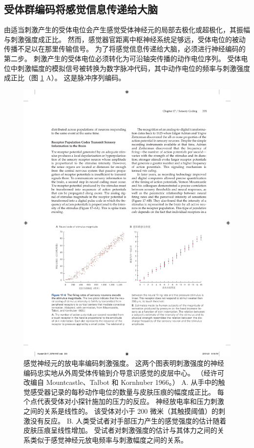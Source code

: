 \subsection{受体群编码将感觉信息传递给大脑}

由适当刺激产生的受体电位会产生感觉受体神经元的局部去极化或超极化，其振幅与刺激强度成正比。 
然而，感觉器官距离中枢神经系统足够远，受体电位的被动传播不足以在那里传输信号。 
为了将感觉信息传递给大脑，必须进行神经编码的第二步。 
刺激产生的受体电位必须转化为可沿轴突传播的动作电位序列。 
受体电位中刺激幅度的模拟信号被转换为数字脉冲代码，其中动作电位的频率与刺激强度成正比（图 \ref{fig:17_6} A）。 
这是脉冲序列编码。

\begin{figure}[htbp]
	\centering
	\includegraphics[width=1.0\linewidth]{chap17/fig_17_6}
	\caption{感觉神经元的放电率编码刺激强度。 
		这两个图表明刺激强度的神经编码忠实地从外周受体传输到介导意识感觉的皮层中心。 （经许可改编自 Mountcastle、Talbot 和 Kornhuber 1966。） 
		A. 从手中的触觉感受器记录的每秒动作电位的数量与皮肤压痕的幅度成正比。 
		每个点代表受体对小探针施加的压力的反应。 
		神经放电率和压力刺激之间的关系是线性的。 
		该受体对小于 200 微米（其触摸阈值）的刺激没有反应。 
		B. 人类受试者对手部压力产生的感觉强度的估计随着皮肤压痕呈线性增加。 
		受试者对刺激强度的估计与其体力之间的关系类似于感觉神经元放电频率与刺激幅度之间的关系。}
	\label{fig:17_6}
\end{figure}




